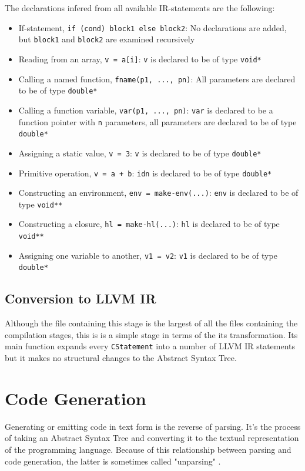 \documentclass[11pt]{report}
\begin{document}
The declarations infered from all available IR-statements are the following:
\begin{itemize}
\item If-statement, \texttt{if (cond) block1 else block2}: No declarations are added, but \texttt{block1} and \texttt{block2} are examined recursively
\item Reading from an array, \texttt{v = a[i]}: \texttt{v} is declared to be of type \texttt{void*}
\item Calling a named function, \texttt{fname(p1, ..., pn)}: All parameters are declared to be of type \texttt{double*}
\item Calling a function variable, \texttt{var(p1, ..., pn)}: \texttt{var} is declared to be a function pointer with \texttt{n} parameters, all parameters are declared to be of type \texttt{double*}
\item Assigning a static value, \texttt{v = 3}: \texttt{v} is declared to be of type \texttt{double*}
\item Primitive operation, \texttt{v = a + b}: \texttt{idn} is declared to be of type \texttt{double*}
\item Constructing an environment, \texttt{env = make-env(...)}: \texttt{env} is declared to be of type \texttt{void**}
\item Constructing a closure, \texttt{hl = make-hl(...)}: \texttt{hl} is declared to be of type \texttt{void**}
\item Assigning one variable to another, \texttt{v1 = v2}: \texttt{v1} is declared to be of type \texttt{double*}
\end{itemize}

\subsection{Conversion to LLVM IR}

Although the file containing this stage is the largest of all the files containing the compilation stages, this is is a simple stage in terms of the its transformation. Its main function expands every \texttt{CStatement} into a number of LLVM IR statements but it makes no structural changes to the Abstract Syntax Tree.


\section{Code Generation}
Generating or emitting code in text form is the reverse of parsing. It's the process of taking an Abstract Syntax Tree and converting it to the textual representation of the programming language. Because of this relationship between parsing and code generation, the latter is sometimes called "unparsing" \cite{nanopass}.
\end{document}
